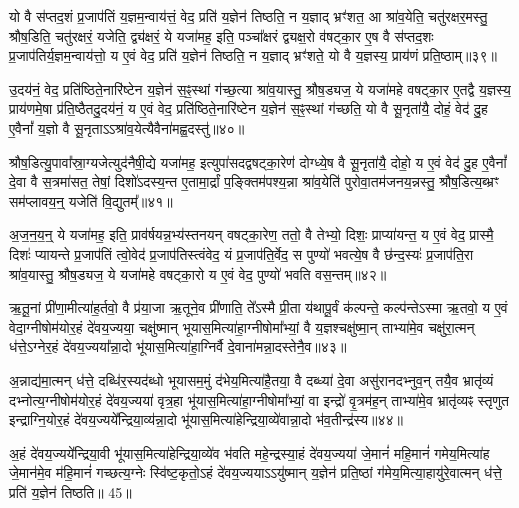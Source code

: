 {\anuvakamend[{तेनै॒व ब्रह्म॑ रा॒ष्ट्रमे॒वास्य॑ य॒ज्ञस्य॑ प्राजाप॒त्यꣳ षट्त्रिꣳ॑शच्च॥10॥}]}

यो वै स॑प्तद॒शं प्र॒जाप॑तिं य॒ज्ञम॒न्वाय॑त्तं॒ वेद॒ प्रति॑ य॒ज्ञेन॑ तिष्ठति॒ न य॒ज्ञाद् भ्रꣳ॑शत॒ आ श्रा॑व॒येति॒ चतु॑रक्षर॒मस्तु॒ श्रौष॒डिति॒ चतु॑रक्षरं॒ यजेति॒ द्व्य॑क्षरं॒ ये यजा॑मह॒ इति॒ पञ्चा᳚क्षरं द्व्यक्ष॒रो व॑षट्का॒र ए॒ष वै स॑प्तद॒शः प्र॒जाप॑तिर्य॒ज्ञम॒न्वाय॑त्तो॒ य ए॒वं वेद॒ प्रति॑ य॒ज्ञेन॑ तिष्ठति॒ न य॒ज्ञाद् भ्रꣳ॑शते॒ यो वै य॒ज्ञस्य॒ प्राय॑णं प्रति॒ष्ठाम्॥३९॥

उ॒दय॑नं॒ वेद॒ प्रति॑ष्ठिते॒नारि॑ष्टेन य॒ज्ञेन॑ स॒ꣴ॒स्थां ग॑च्छ॒त्या श्रा॑व॒यास्तु॒ श्रौष॒ड्यज॒ ये यजा॑महे वषट्का॒र ए॒तद्वै य॒ज्ञस्य॒ प्राय॑णमे॒षा प्र॑ति॒ष्ठैतदु॒दय॑नं॒ य ए॒वं वेद॒ प्रति॑ष्ठिते॒नारि॑ष्टेन य॒ज्ञेन॑ स॒ꣴ॒स्थां ग॑च्छति॒ यो वै सू॒नृता॑यै॒ दोहं॒ वेद॑ दु॒ह ए॒वैनां᳚ य॒ज्ञो वै सू॒नृता\-ऽ\-ऽश्रा॑व॒येत्यैवैना॑मह्व॒दस्तु॑॥४०॥

श्रौष॒डित्यु॒पावा᳚स्रा॒ग्यजेत्युद॑नैषी॒द्ये यजा॑मह॒ इत्युपा॑सदद्वषट्का॒रेण॑ दोग्ध्ये॒ष वै सू॒नृता॑यै॒ दोहो॒ य ए॒वं वेद॑ दु॒ह ए॒वैनां᳚ दे॒वा वै स॒त्रमा॑सत॒ तेषां॒ दिशो॑\-ऽदस्य॒न्त ए॒तामा॒र्द्रां प॒ङ्क्तिम॑पश्य॒न्ना श्रा॑व॒येति॑ पुरोवा॒तम॑जनय॒न्नस्तु॒ श्रौष॒डित्य॒ब्भ्रꣳ सम॑प्लावय॒न्॒ यजेति॑ वि॒द्युतम्᳚॥४१॥

अ॒ज॒न॒य॒न्॒ ये यजा॑मह॒ इति॒ प्राव॑र्\mbox{}षयन्न॒भ्य॑स्तनयन् वषट्का॒रेण॒ ततो॒ वै तेभ्यो॒ दिशः॒ प्राप्या॑यन्त॒ य ए॒वं वेद॒ प्रास्मै॒ दिशः॑ प्यायन्ते प्र॒जाप॑तिं त्वो॒वेद॑ प्र॒जाप॑तिस्त्वंवेद॒ यं प्र॒जाप॑ति॒र्वेद॒ स पुण्यो॑ भवत्ये॒ष वै छ॑न्द॒स्यः॑ प्र॒जाप॑ति॒रा श्रा॑व॒यास्तु॒ श्रौष॒ड्यज॒ ये यजा॑महे वषट्का॒रो य ए॒वं वेद॒ पुण्यो॑ भवति वस॒न्तम्॥४२॥

ऋ॒तू॒नां प्री॑णा॒मीत्या॑ह॒र्तवो॒ वै प्र॑या॒जा ऋ॒तूने॒व प्री॑णाति॒ ते᳚\-ऽस्मै प्री॒ता य॑थापू॒र्वं क॑ल्पन्ते॒ कल्प॑न्ते\-ऽस्मा ऋ॒तवो॒ य ए॒वं वेदा॒ग्नीषोम॑योर॒हं दे॑वय॒ज्यया॒ चक्षु॑ष्मान् भूयास॒मित्या॑हा॒ग्नीषोमा᳚भ्यां॒ वै य॒ज्ञश्चक्षु॑ष्मा॒न् ताभ्या॑मे॒व चक्षु॑रा॒त्मन् ध॑त्ते॒\-ऽग्नेर॒हं दे॑वय॒ज्यया᳚न्ना॒दो भू॑यास॒मित्या॑हा॒ग्निर्वै दे॒वाना॑मन्ना॒दस्तेनै॒व॥४३॥

अ॒न्नाद्य॑मा॒त्मन् ध॑त्ते॒ दब्धि॑र॒स्यद॑ब्धो भूयासम॒मुं द॑भेय॒मित्या॑है॒तया॒ वै दब्ध्या॑ दे॒वा असु॑रानदभ्नुव॒न् तयै॒व भ्रातृ॑व्यं दभ्नोत्य॒ग्नीषोम॑योर॒हं दे॑वय॒ज्यया॑ वृत्र॒हा भू॑यास॒मित्या॑हा॒ग्नीषोमा᳚भ्यां॒ वा इन्द्रो॑ वृ॒त्रम॑ह॒न् ताभ्या॑मे॒व भ्रातृ॑व्यꣴ स्तृणुत इन्द्राग्नि॒योर॒हं दे॑वय॒ज्यये᳚न्द्रिया॒व्य॑न्ना॒दो भू॑यास॒मित्या॑हेन्द्रिया॒व्ये॑वान्ना॒दो भ॑व॒तीन्द्र॑स्य॥४४॥

अ॒हं दे॑वय॒ज्यये᳚न्द्रिया॒वी भू॑यास॒मित्या॑हेन्द्रिया॒व्ये॑व भ॑वति महे॒न्द्रस्या॒हं दे॑वय॒ज्यया॑ जे॒मानं॑ महि॒मानं॑ गमेय॒मित्या॑ह जे॒मान॑मे॒व म॑हि॒मानं॑ गच्छत्य॒ग्नेः स्वि॑ष्ट॒कृतो॒\-ऽहं दे॑वय॒ज्यया\-ऽ\-ऽयु॑ष्मान् य॒ज्ञेन॑ प्रति॒ष्ठां ग॑मेय॒मित्या॒हायु॑रे॒वात्मन् ध॑त्ते॒ प्रति॑ य॒ज्ञेन॑ तिष्ठति॥ 45॥


